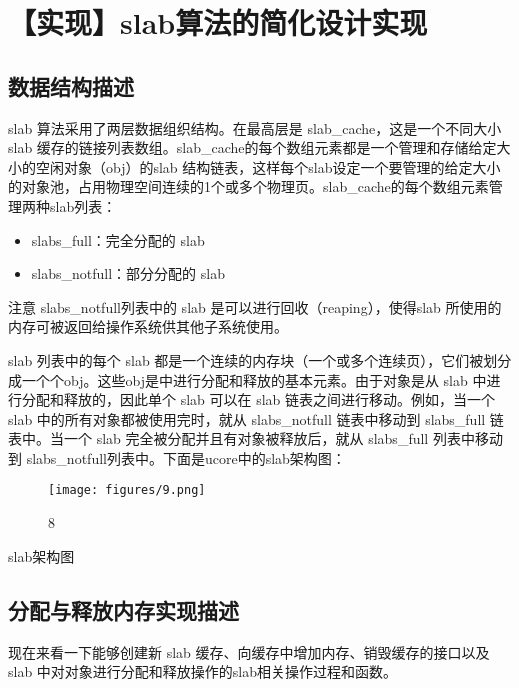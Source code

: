 \section{【实现】slab算法的简化设计实现}\label{ux5b9eux73b0slabux7b97ux6cd5ux7684ux7b80ux5316ux8bbeux8ba1ux5b9eux73b0}

\subsection{数据结构描述}\label{ux6570ux636eux7ed3ux6784ux63cfux8ff0}

slab 算法采用了两层数据组织结构。在最高层是
slab\_cache，这是一个不同大小slab
缓存的链接列表数组。slab\_cache的每个数组元素都是一个管理和存储给定大小的空闲对象（obj）的slab
结构链表，这样每个slab设定一个要管理的给定大小的对象池，占用物理空间连续的1个或多个物理页。slab\_cache的每个数组元素管理两种slab列表：

\begin{itemize}
\tightlist
\item
  slabs\_full：完全分配的 slab
\item
  slabs\_notfull：部分分配的 slab
\end{itemize}

注意 slabs\_notfull列表中的 slab 是可以进行回收（reaping），使得slab
所使用的内存可被返回给操作系统供其他子系统使用。

slab 列表中的每个 slab
都是一个连续的内存块（一个或多个连续页），它们被划分成一个个obj。这些obj是中进行分配和释放的基本元素。由于对象是从
slab 中进行分配和释放的，因此单个 slab 可以在 slab
链表之间进行移动。例如，当一个 slab 中的所有对象都被使用完时，就从
slabs\_notfull 链表中移动到 slabs\_full 链表中。当一个 slab
完全被分配并且有对象被释放后，就从 slabs\_full 列表中移动到
slabs\_notfull列表中。下面是ucore中的slab架构图：

\begin{figure}[htbp]
\centering
\texttt{[image: figures/9.png]}
\caption{8}
\end{figure}

slab架构图

\subsection{分配与释放内存实现描述}\label{ux5206ux914dux4e0eux91caux653eux5185ux5b58ux5b9eux73b0ux63cfux8ff0}

现在来看一下能够创建新 slab 缓存、向缓存中增加内存、销毁缓存的接口以及
slab 中对对象进行分配和释放操作的slab相关操作过程和函数。

